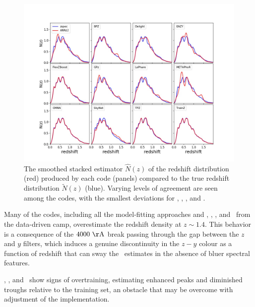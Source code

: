 \begin{figure}
	\centering
	\includegraphics[width=\textwidth]{figures/pzdc1/NZsumplot_12codes_scottsrule.jpg}
	\caption{The smoothed stacked estimator $\hat{N}(z)$ of the redshift distribution (red) produced by each code (panels) compared to the true redshift distribution $\tilde{N}(z)$ (blue).
		Varying levels of agreement are seen among the codes, with the smallest deviations for \cmnn, \flexzboost, \tpz, and \trainz.}
\end{figure}

Many of the codes, including all the model-fitting approaches and \annz, \gpz, \metaphor, and \skynet\ from the data-driven camp, overestimate the redshift density at $z \sim 1.4$.
This behavior is a consequence of the $4000\ {\rm \AA}$ break passing through the gap between the $z$ and $y$ filters, which induces a genuine discontinuity in the $z - y$ colour as a function of redshift that can sway the \pzpdf\ estimates in the absence of bluer spectral features.

\annz, \gpz, and \metaphor\ show signs of overtraining, estimating enhanced peaks and diminished troughs relative to the training set, an obstacle that may be overcome with adjustment of the implementation.

